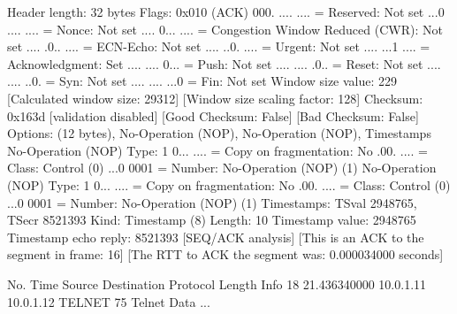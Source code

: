     Header length: 32 bytes
    Flags: 0x010 (ACK)
        000. .... .... = Reserved: Not set
        ...0 .... .... = Nonce: Not set
        .... 0... .... = Congestion Window Reduced (CWR): Not set
        .... .0.. .... = ECN-Echo: Not set
        .... ..0. .... = Urgent: Not set
        .... ...1 .... = Acknowledgment: Set
        .... .... 0... = Push: Not set
        .... .... .0.. = Reset: Not set
        .... .... ..0. = Syn: Not set
        .... .... ...0 = Fin: Not set
    Window size value: 229
    [Calculated window size: 29312]
    [Window size scaling factor: 128]
    Checksum: 0x163d [validation disabled]
        [Good Checksum: False]
        [Bad Checksum: False]
    Options: (12 bytes), No-Operation (NOP), No-Operation (NOP), Timestamps
        No-Operation (NOP)
            Type: 1
                0... .... = Copy on fragmentation: No
                .00. .... = Class: Control (0)
                ...0 0001 = Number: No-Operation (NOP) (1)
        No-Operation (NOP)
            Type: 1
                0... .... = Copy on fragmentation: No
                .00. .... = Class: Control (0)
                ...0 0001 = Number: No-Operation (NOP) (1)
        Timestamps: TSval 2948765, TSecr 8521393
            Kind: Timestamp (8)
            Length: 10
            Timestamp value: 2948765
            Timestamp echo reply: 8521393
    [SEQ/ACK analysis]
        [This is an ACK to the segment in frame: 16]
        [The RTT to ACK the segment was: 0.000034000 seconds]

No.     Time           Source                Destination           Protocol Length Info
     18 21.436340000   10.0.1.11             10.0.1.12             TELNET   75     Telnet Data ...


